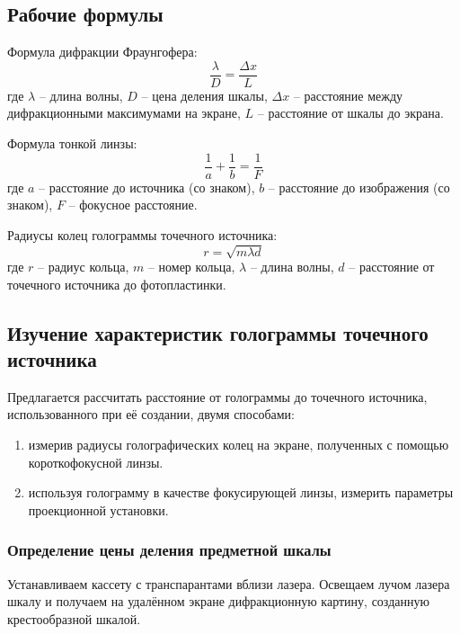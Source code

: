 
\subsection*{Рабочие формулы}
    Формула дифракции Фраунгофера:
    \begin{equation}\label{eq::fraung}
        \frac{\lambda}{D} = \frac{\Delta x}{L}
    \end{equation}
    где $\lambda$ -- длина волны, $D$ -- цена деления шкалы,
    $\Delta x$ -- расстояние между дифракционными максимумами на экране,
    $L$ -- расстояние от шкалы до экрана.

    Формула тонкой линзы:
    \begin{equation}\label{eq::thin_lense}
        \frac{1}{a} + \frac{1}{b} = \frac{1}{F}
    \end{equation}
    где $a$ -- расстояние до источника (со знаком),
    $b$ -- расстояние до изображения (со знаком),
    $F$ -- фокусное расстояние.
 

    Радиусы колец голограммы точечного источника:
    \begin{equation}\label{eq::rad}
        r = \sqrt{m \lambda d}
    \end{equation}
    где $r$ -- радиус кольца, $m$ -- номер кольца, $\lambda$ --  длина волны,
    $d$ -- расстояние от точечного источника до фотопластинки. 

\subsection{Изучение характеристик голограммы точечного источника}

    Предлагается рассчитать расстояние от голограммы до точечного 
    источника, использованного при её создании, двумя способами:
    \begin{enumerate}
        \item измерив радиусы голографических колец на экране, 
                полученных с помощью короткофокусной линзы.
        \item используя голограмму в качестве фокусирующей линзы, 
              измерить параметры проекционной установки.
    \end{enumerate}

    \subsubsection*{Определение цены деления предметной шкалы}

        Устанавливаем кассету с транспарантами вблизи лазера. Освещаем лучом лазера шкалу и 
        получаем на удалённом экране дифракционную картину, созданную крестообразной шкалой.

